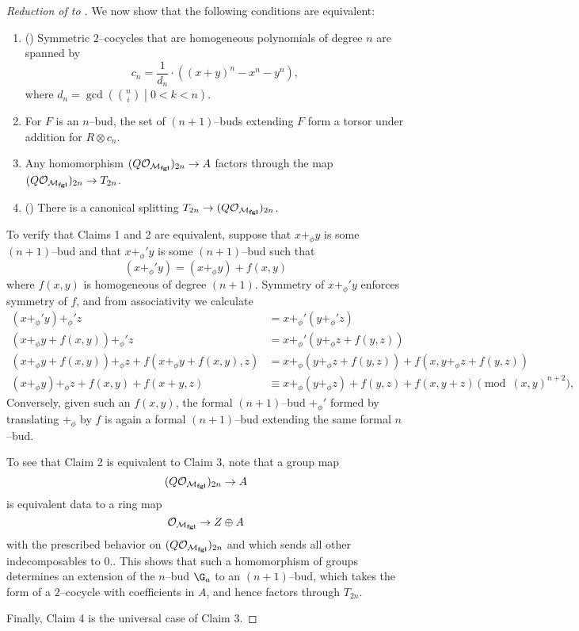 \begin{proof}[{Reduction of  to }]
We now show that the following conditions are equivalent:
\begin{enumerate}
\item () Symmetric $2$--cocycles that are homogeneous polynomials of degree $n$ are spanned by \[c_n = \frac{1}{d_n} \cdot ((x + y)^n - x^n - y^n),\] where $d_n = \gcd\left( \binom{n}{i} \middle| 0 < k < n \right)$.
\item For $F$ is an $n$--bud, the set of $(n+1)$--buds extending $F$ form a torsor under addition for $R \otimes c_n$.
\item Any homomorphism $(Q\mathcal O_{\mathcal{M}_{\mathbf{fgl}}})_{2n} \to A$ factors through the map $(Q \mathcal O_{\mathcal{M}_{\mathbf{fgl}}})_{2n} \to T_{2n}$.
\item () There is a canonical splitting $T_{2n} \to (Q \mathcal O_{\mathcal{M}_{\mathbf{fgl}}})_{2n}$.
\end{enumerate}

To verify that Claims 1 and 2 are equivalent, suppose that $x +_\phi y$ is some $(n+1)$--bud and that $x +_\phi' y$ is some $(n+1)$--bud such that \[(x +_\phi' y) = (x +_\phi y) + f(x, y)\] where $f(x, y)$ is homogeneous of degree $(n+1)$.  Symmetry of $x +_\phi' y$ enforces symmetry of $f$, and from associativity we calculate
\begin{align*}
(x +_\phi' y) +_\phi' z & = x +_\phi' (y +_\phi' z) \\
(x +_\phi y + f(x, y)) +_\phi' z & = x +_\phi' (y +_\phi z + f(y, z)) \\
(x +_\phi y + f(x, y)) +_\phi z + f(x +_\phi y + f(x, y), z) & = x +_\phi (y +_\phi z + f(y, z)) + f(x, y +_\phi z + f(y, z)) \\
(x +_\phi y) +_\phi z + f(x, y) + f(x + y, z) & \equiv x +_\phi (y +_\phi z) + f(y, z) + f(x, y + z) \pmod{(x, y)^{n+2}},
\end{align*}
Conversely, given such an $f(x, y)$, the formal $(n+1)$--bud $+_\phi'$ formed by translating $+_\phi$ by $f$ is again a formal $(n+1)$--bud extending the same formal $n$--bud.

To see that Claim 2 is equivalent to Claim 3, note that a group map \[(Q\mathcal O_{\mathcal{M}_{\mathbf{fgl}}})_{2n} \to A\] is equivalent data to a ring map \[\mathcal O_{\mathcal{M}_{\mathbf{fgl}}} \to Z \oplus A\] with the prescribed behavior on $(Q\mathcal O_{\mathcal{M}_{\mathbf{fgl}}})_{2n}$ and which sends all other indecomposables to $0$..  This shows that such a homomorphism of groups determines an extension of the $n$--bud $\G_a$ to an $(n+1)$--bud, which takes the form of a $2$--cocycle with coefficients in $A$, and hence factors through $T_{2n}$.

Finally, Claim 4 is the universal case of Claim 3.
\end{proof}

